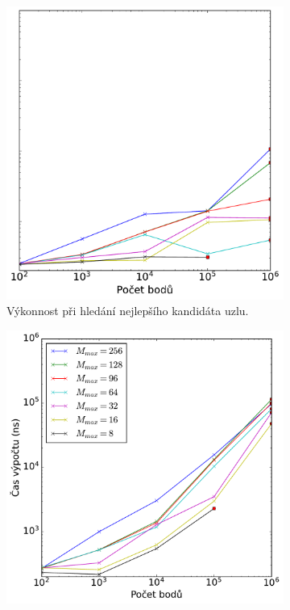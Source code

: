 \begin{figure}[ht]
\begin{subfigure}[t]{0.49\columnwidth}
    \includegraphics[scale=0.4]{obrazky-figures/benchmark/nn_normal/benchmark_nn_normal_speed_nnNormalLeaf.pdf}
\caption{ Výkonnost při hledání nejlepšího kandidáta uzlu.}
\end{subfigure}
\hfill
\begin{subfigure}[t]{0.49\columnwidth}
    \centering  
    \includegraphics[scale=0.4]{obrazky-figures/benchmark/nn_normal/benchmark_nn_normal_speed_nnNormalIterator.pdf}

\end{subfigure}
\end{figure}
